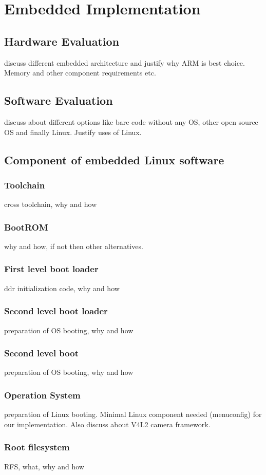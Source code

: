 
\chapter{Embedded Implementation} %
\label{Chapter3}
\section {Hardware Evaluation}
discuss different embedded architecture and justify why ARM is best
choice. Memory and other component requirements etc.
\section {Software Evaluation}
discuss about different options like bare code without any OS, other
open source OS and finally Linux. Justify uses of Linux.
\section {Component of embedded Linux software}
\subsection {Toolchain}
cross toolchain, why and how
\subsection {BootROM}
why and how, if not then other alternatives.
\subsection {First level boot loader}
ddr initialization code, why and how
\subsection {Second level boot loader}
preparation of OS booting, why and how
\subsection {Second level boot }
preparation of OS booting, why and how
\subsection {Operation System}
preparation of Linux booting. Minimal Linux component needed
(menuconfig) for our implementation. Also discuss about V4L2 camera
framework.
\subsection {Root filesystem}
RFS, what, why and how
